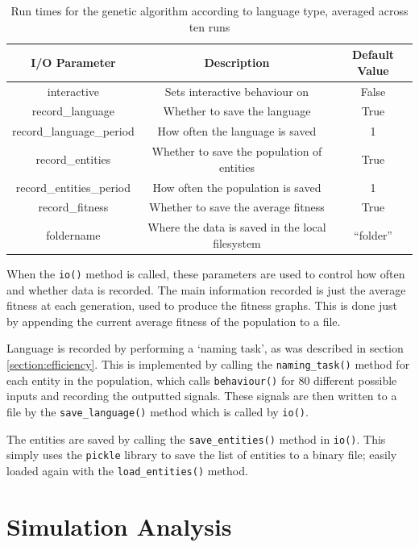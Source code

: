 \documentclass[12pt,a4paper,twoside,openright]{report}
\begin{document}
\begin{table}[t]
\centering
 \begin{tabular}{ c | c | c}
 \bf{I/O Parameter} & \bf{Description} & \bf{Default Value} \\ [0.5ex] 
 \hline
interactive & Sets interactive behaviour on & False \\
record\_language & Whether to save the language & True \\
record\_language\_period & How often the language is saved & 1 \\
record\_entities & Whether to save the population of entities & True \\
record\_entities\_period & How often the population is saved & 1 \\
record\_fitness & Whether to save the average fitness & True \\
foldername & Where the data is saved in the local filesystem & ``folder'' \\
\end{tabular}
\caption{Run times for the genetic algorithm according to language type, averaged across ten runs}
\label{table:io-params}
\end{table}

When the \texttt{io()} method is called, these parameters are used to control how often and whether data is recorded. The main information recorded is just the average fitness at each generation, used to produce the fitness graphs. This is done just by appending the current average fitness of the population to a file.

Language is recorded by performing a `naming task', as was described in section \ref{section:efficiency}. This is implemented by calling the \texttt{naming\_task()} method for each entity in the population, which calls \texttt{behaviour()} for 80 different possible inputs and recording the outputted signals. These signals are then written to a file by the \texttt{save\_language()} method which is called by \texttt{io()}.

The entities are saved by calling the \texttt{save\_entities()} method in \texttt{io()}. This simply uses the \texttt{pickle} library to save the list of entities to a binary file; easily loaded again with the \texttt{load\_entities()} method.

\section{Simulation Analysis}
\end{document}
